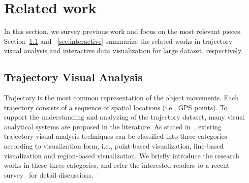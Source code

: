 \section{Related work}\label{sec:rel}
In this section, we survey previous work and focus on the most relevant pieces.
Section~\ref{sec:trajvisana} and ~\ref{sec:interactive} summarize the related works in trajectory visual analysis and interactive data visualization for large dataset, respectively.

\subsection{Trajectory Visual Analysis}\label{sec:trajvisana}
Trajectory is the most common representation of the object movements.
Each trajectory consists of a sequence of spatial locations (i.e., GPS points).
To support the understanding and analyzing of the trajectory dataset,
many visual analytical systems are proposed in the literature.
As stated in~\cite{chen2015survey}, existing trajectory visual analysis techniques can be classified into three categories according to visualization form,
i.e., point-based visualization, line-based visualization and region-based visualization.
We briefly introduce the research works in these three categories, and refer the interested readers to a recent survey~\cite{chen2015survey} for detail discussions.

